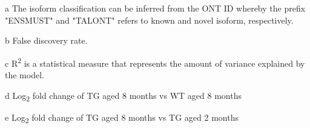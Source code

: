 \begin{landscape}
\begin{table}[]
\begin{threeparttable}
\begin{tabular}{@{}ccccccccccc@{}}
	\end{tabular}
	\begin{tablenotes}
	\footnotesize
	\item[a] The isoform classification can be inferred from the ONT ID whereby the prefix "ENSMUST" and "TALONT" refers to known and novel isoform, respectively.
	\item[b] False discovery rate.
	\item[c] R\textsuperscript{2} is a statistical measure that represents the amount of variance explained by the model.
	\item[d] Log\textsubscript{2} fold change of TG aged 8 months vs WT aged 8 months
	\item[e] Log\textsubscript{2} fold change of TG aged 8 months vs TG aged 2 months
	\end{tablenotes}
	\end{threeparttable}
\end{table}	
\end{landscape}


